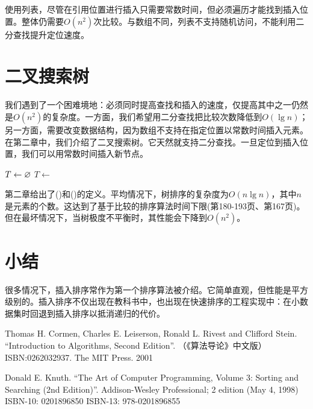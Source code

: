 \documentclass[b5paper]{ctexart}
\begin{document}
使用列表，尽管在引用位置进行插入只需要常数时间，但必须遍历才能找到插入位置。整体仍需要$O(n^2)$次比较。与数组不同，列表不支持随机访问，不能利用二分查找提升定位速度。

\begin{Exercise}
\end{Exercise}

\section{二叉搜索树}

我们遇到了一个困难境地：必须同时提高查找和插入的速度，仅提高其中之一仍然是$O(n^2)$的复杂度。一方面，我们希望用二分查找把比较次数降低到$O(\lg n)$；另一方面，需要改变数据结构，因为数组不支持在指定位置以常数时间插入元素。在第二章中，我们介绍了二叉搜索树。它天然就支持二分查找。一旦定位到插入位置，我们可以用常数时间插入新节点。

\begin{algorithmic}[1]
  \State $T \gets \varnothing$
    \State $T \gets $ 
  \EndFor
  \State \Return {}
\EndFunction
\end{algorithmic}

第二章给出了()和()的定义。平均情况下，树排序的复杂度为$O(n \lg n)$，其中$n$是元素的个数。这达到了基于比较的排序算法时间下限(\cite{Knuth-V3}第180-193页、\cite{CLRS}第167页)。但在最坏情况下，当树极度不平衡时，其性能会下降到$O(n^2)$。

\section{小结}
很多情况下，插入排序常作为第一个排序算法被介绍。它简单直观，但性能是平方级别的。插入排序不仅出现在教科书中，也出现在快速排序的工程实现中：在小数据集时回退到插入排序以抵消递归的代价。

\ifx\wholebook\relax \else
\begin{thebibliography}{99}

Thomas H. Cormen, Charles E. Leiserson, Ronald L. Rivest and Clifford Stein.
``Introduction to Algorithms, Second Edition''. （《算法导论》中文版）ISBN:0262032937. The MIT Press. 2001

Donald E. Knuth. ``The Art of Computer Programming, Volume 3: Sorting and Searching (2nd Edition)''. Addison-Wesley Professional; 2 edition (May 4, 1998) ISBN-10: 0201896850 ISBN-13: 978-0201896855

\end{thebibliography}
\end{document}
